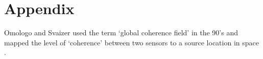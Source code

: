 \section{Appendix}

Omologo and Svaizer used the term `global coherence field' in the 90's and mapped the level of `coherence' between two sensors to a source location in space \cite{omologo1994acoustic}.